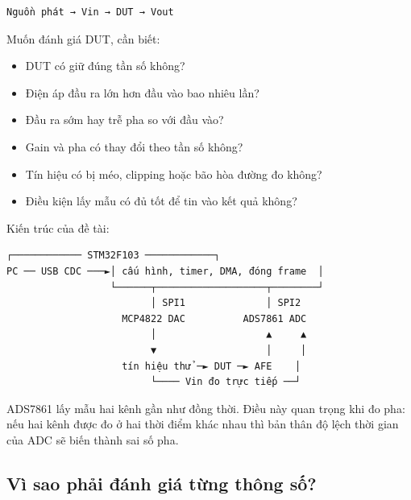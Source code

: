 \documentclass[12pt,a4paper,oneside]{article}
\begin{document}
\begin{Verbatim}[breaklines=true,breakanywhere=true,fontsize=\small]
Nguồn phát → Vin → DUT → Vout
\end{Verbatim}

Muốn đánh giá DUT, cần biết:

\begin{itemize}
\item DUT có giữ đúng tần số không?
\item Điện áp đầu ra lớn hơn đầu vào bao nhiêu lần?
\item Đầu ra sớm hay trễ pha so với đầu vào?
\item Gain và pha có thay đổi theo tần số không?
\item Tín hiệu có bị méo, clipping hoặc bão hòa đường đo không?
\item Điều kiện lấy mẫu có đủ tốt để tin vào kết quả không?
\end{itemize}

Kiến trúc của đề tài:

\begin{Verbatim}[breaklines=true,breakanywhere=true,fontsize=\small]
                  ┌──────────── STM32F103 ────────────┐
PC ── USB CDC ───►│ cấu hình, timer, DMA, đóng frame  │
                  └──────┬───────────────────┬────────┘
                         │ SPI1              │ SPI2
                    MCP4822 DAC          ADS7861 ADC
                         │                   ▲     ▲
                         ▼                   │     │
                    tín hiệu thử ─► DUT ─► AFE    │
                         └──── Vin đo trực tiếp ──┘
\end{Verbatim}

ADS7861 lấy mẫu hai kênh gần như đồng thời. Điều này quan trọng khi đo pha: nếu hai kênh được đo ở hai thời điểm khác nhau thì bản thân độ lệch thời gian của ADC sẽ biến thành sai số pha.

\subsection{Vì sao phải đánh giá từng thông số?}
\end{document}
